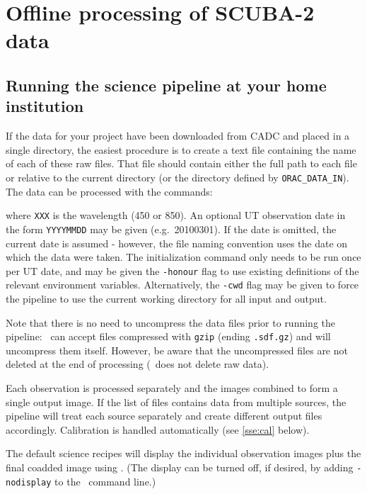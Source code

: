 \section{Offline processing of SCUBA-2 data\label{se:offline}}

\subsection{Running the science pipeline at your home institution}

If the data for your project have been downloaded from CADC and placed
in a single directory, the easiest procedure is to create a text file
containing the name of each of these raw files. That file should
contain either the full path to each file or relative to the current
directory (or the directory defined by \verb+ORAC_DATA_IN+). The data
can be processed with the commands:
\begin{terminalv}
\end{terminalv}
where \verb+XXX+ is the wavelength (450 or 850). An optional UT
observation date in the form \verb+YYYYMMDD+ may be given
(e.g.\ 20100301). If the date is omitted, the current date is assumed
- however, the file naming convention uses the date on which the data
were taken. The initialization command only needs to be run once per
UT date, and may be given the \verb+-honour+ flag to use existing
definitions of the relevant environment variables. Alternatively, the
\verb+-cwd+ flag may be given to force the pipeline to use the current
working directory for all input and output.

Note that there is no need to uncompress the data files prior to
running the pipeline: \oracdr\ can accept files compressed with
\verb+gzip+ (ending \verb+.sdf.gz+) and will uncompress them
itself. However, be aware that the uncompressed files are not deleted
at the end of processing (\oracdr\ does not delete raw data).

Each observation is processed separately and the images combined to
form a single output image. If the list of files contains data from
multiple sources, the pipeline will treat each source separately and
create different output files accordingly. Calibration is handled
automatically (see \ref{sse:cal} below).

The default science recipes will display the individual observation
images plus the final coadded image using \GAIA. (The display can be
turned off, if desired, by adding \texttt{-nodisplay} to the
\oracdr\ command line.)

